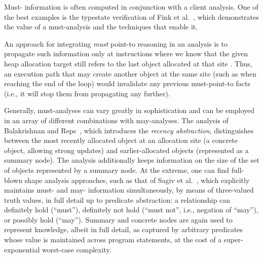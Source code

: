 Must- information is often computed in conjunction with a
client analysis. One of the best examples is the typestate
verification of Fink et al.~\cite{issta:2006:Fink}, which demonstrates the value of
a must-analysis and the techniques that enable it.


An approach for integrating \emph{must} point-to reasoning in an
analysis is to propagate such
information only at instructions where we know that the given heap
allocation target still refers to the last object allocated at that
site \cite{popl:1995:Altucher}. Thus, an execution path
that may create another object at the same site (such as when reaching
the end of the loop) would invalidate any previous must-point-to facts
(i.e., it will stop them from propagating any further).

Generally, must-analyses can vary greatly in sophistication and can be
employed in an array of different combinations with may-analyses.  The
analysis of Balakrishnan and Reps~\cite{sas:2006:Balakrishnan}, which
introduces the \emph{recency abstraction}, distinguishes between the
most recently allocated object at an allocation site (a concrete
object, allowing strong updates) and earlier-allocated objects
(represented as a summary node). The analysis additionally keeps
information on the size of the set of objects represented by a summary
node. At the extreme, one can find full-blown shape analysis
approaches, such as that of Sagiv et
al.~\cite{article:2002:Sagiv}, which explicitly maintains must-
and may- information simultaneously, by means of three-valued truth
values, in full detail up to predicate abstraction: a
relationship can definitely hold (``must''), definitely not hold
(``must not'', i.e., negation of ``may''), or possibly hold
(``may''). Summary and concrete nodes are again used to represent
knowledge, albeit in full detail, as captured by arbitrary predicates
whose value is maintained across program statements, at the cost of a
super-exponential worst-case complexity.

